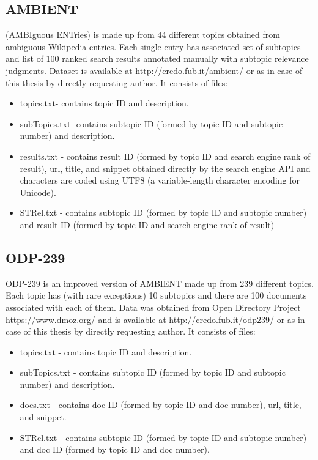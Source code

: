 \documentclass[a4paper, 12pt, oneside]{Thesis} %
\begin{document}
\subsection{AMBIENT} (AMBIguous ENTries) is made up from 44 different topics obtained from ambiguous Wikipedia entries. Each single entry has associated set of subtopics and list of 100 ranked search results annotated manually with subtopic relevance judgments. Dataset is available at \url{http://credo.fub.it/ambient/} or as in case of this thesis by directly requesting author. It consists of files:
 \begin{itemize}
 \item topics.txt- contains topic ID and description.
\item subTopics.txt- contains subtopic ID (formed by topic ID and subtopic number) and description.
\item results.txt - contains result ID (formed by topic ID and search engine rank of result), url,  title, and snippet obtained directly by the search engine API and characters are coded using UTF8 (a variable-length character encoding for Unicode).
\item STRel.txt - contains subtopic ID (formed by topic ID and subtopic number) and result ID (formed by topic ID and search engine rank of result)
 \end{itemize}

\subsection{ODP-239} ODP-239 is an improved version of AMBIENT made up from 239 different topics. Each topic has (with rare exceptions) 10 subtopics and there are 100 documents associated with each of them. Data was obtained from Open Directory Project \url{https://www.dmoz.org/} and is available at \url{http://credo.fub.it/odp239/} or as in case of this thesis by directly requesting author. It consists of files:
\begin{itemize}
 \item topics.txt - contains topic ID and description.
 \item subTopics.txt - contains subtopic ID (formed by topic ID and subtopic number) and description.
 \item docs.txt - contains doc ID (formed by topic ID and doc number), url, title, and snippet. 
 \item STRel.txt - contains subtopic ID (formed by topic ID and subtopic number) and doc ID (formed by topic ID and doc number).
\end{itemize}
\end{document}

